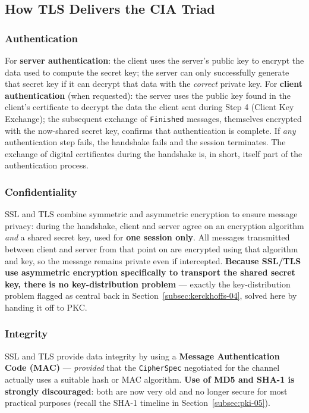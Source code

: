\documentclass[12pt, a4paper]{article}
\begin{document}
\subsection{How TLS Delivers the CIA Triad}
\label{subsec:tls-cia-05}

\subsubsection{Authentication}
For \textbf{server authentication}: the client uses the server's public key to encrypt the data used to compute the secret key; the server can only successfully generate that secret key if it can decrypt that data with the \emph{correct} private key. For \textbf{client authentication} (when requested): the server uses the public key found in the client's certificate to decrypt the data the client sent during Step 4 (Client Key Exchange); the subsequent exchange of \texttt{Finished} messages, themselves encrypted with the now-shared secret key, confirms that authentication is complete. If \emph{any} authentication step fails, the handshake fails and the session terminates. The exchange of digital certificates during the handshake is, in short, itself part of the authentication process.

\subsubsection{Confidentiality}
SSL and TLS combine symmetric and asymmetric encryption to ensure message privacy: during the handshake, client and server agree on an encryption algorithm \emph{and} a shared secret key, used for \textbf{one session only}. All messages transmitted between client and server from that point on are encrypted using that algorithm and key, so the message remains private even if intercepted. \textcolor{ForestGreen!60!black}{\textbf{Because SSL/TLS use asymmetric encryption specifically to transport the shared secret key, there is no key-distribution problem}} --- exactly the key-distribution problem flagged as central back in Section~\ref{subsec:kerckhoffs-04}, solved here by handing it off to PKC.

\subsubsection{Integrity}
SSL and TLS provide data integrity by using a \textbf{Message Authentication Code (MAC)} --- \emph{provided} that the \texttt{CipherSpec} negotiated for the channel actually uses a suitable hash or MAC algorithm. \textcolor{red!70!black}{\textbf{Use of MD5 and SHA-1 is strongly discouraged}}: both are now very old and no longer secure for most practical purposes (recall the SHA-1 timeline in Section~\ref{subsec:pki-05}).
\end{document}
